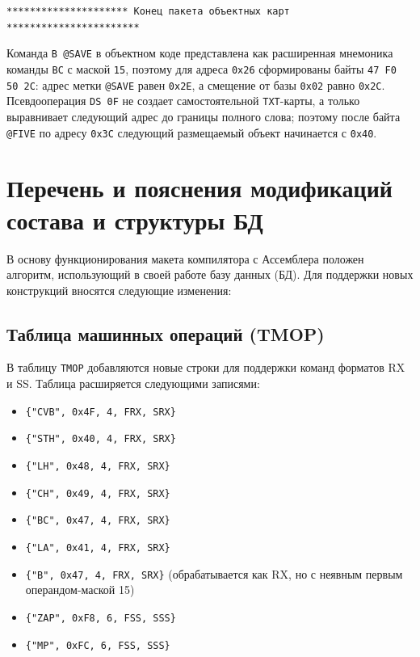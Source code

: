 \documentclass[12pt, a4paper]{article}
\begin{document}
\scriptsize
\setlength{\tabcolsep}{2pt}
\objendcard
\normalsize
\setlength{\tabcolsep}{6pt}

\begin{center}
\texttt{********************* Конец пакета объектных карт ***********************}
\end{center}

Команда \texttt{B @SAVE} в объектном коде представлена как расширенная мнемоника команды \texttt{BC} с маской \texttt{15}, поэтому для адреса \texttt{0x26} сформированы байты \texttt{47 F0 50 2C}: адрес метки \texttt{@SAVE} равен \texttt{0x2E}, а смещение от базы \texttt{0x02} равно \texttt{0x2C}. Псевдооперация \texttt{DS 0F} не создает самостоятельной \texttt{TXT}-карты, а только выравнивает следующий адрес до границы полного слова; поэтому после байта \texttt{@FIVE} по адресу \texttt{0x3C} следующий размещаемый объект начинается с \texttt{0x40}.

\section{Перечень и пояснения модификаций состава и структуры БД}

В основу функционирования макета компилятора с Ассемблера положен алгоритм, использующий в своей работе базу данных (БД). Для поддержки новых конструкций вносятся следующие изменения:

\subsection{Таблица машинных операций (TMOP)}
В таблицу \texttt{TMOP} добавляются новые строки для поддержки команд форматов RX и SS. Таблица расширяется следующими записями:
\begin{itemize}
    \item \texttt{\{"CVB", 0x4F, 4, FRX, SRX\}}
    \item \texttt{\{"STH", 0x40, 4, FRX, SRX\}}
    \item \texttt{\{"LH",  0x48, 4, FRX, SRX\}}
    \item \texttt{\{"CH",  0x49, 4, FRX, SRX\}}
    \item \texttt{\{"BC",  0x47, 4, FRX, SRX\}}
    \item \texttt{\{"LA",  0x41, 4, FRX, SRX\}}
    \item \texttt{\{"B",   0x47, 4, FRX, SRX\}} (обрабатывается как RX, но с неявным первым операндом-маской 15)
    \item \texttt{\{"ZAP", 0xF8, 6, FSS, SSS\}}
    \item \texttt{\{"MP",  0xFC, 6, FSS, SSS\}}
\end{itemize}
\end{document}
